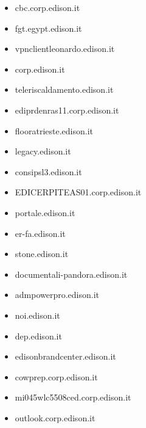 \documentclass{article}
\begin{document}
\begin{itemize}
            \item cbc.corp.edison.it
        
            \item fgt.egypt.edison.it
        
            \item vpnclientleonardo.edison.it
        
            \item corp.edison.it
        
            \item teleriscaldamento.edison.it
        
            \item ediprdenras11.corp.edison.it
        
            \item flooratrieste.edison.it
        
            \item legacy.edison.it
        
            \item consipsl3.edison.it
        
            \item EDICERPITEAS01.corp.edison.it
        
            \item portale.edison.it
        
            \item er-fa.edison.it
        
            \item stone.edison.it
        
            \item documentali-pandora.edison.it
        
            \item admpowerpro.edison.it
        
            \item noi.edison.it
        
            \item dep.edison.it
        
            \item edisonbrandcenter.edison.it
        
            \item cowprep.corp.edison.it
        
            \item mi045wlc5508ced.corp.edison.it
        
            \item outlook.corp.edison.it
        

\end{itemize}
\end{document}
